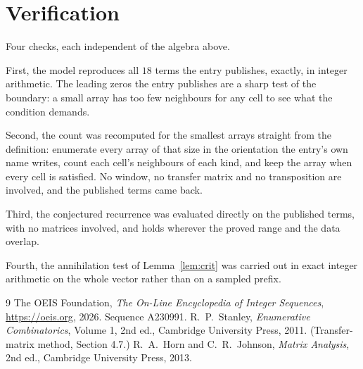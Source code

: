 \documentclass[11pt,a4paper]{article}
\theoremstyle{plain}
\theoremstyle{definition}
\begin{document}
\section{Verification}

Four checks, each independent of the algebra above.

First, the model reproduces all $18$ terms the entry publishes, exactly, in integer
arithmetic. The leading zeros the entry publishes are a sharp test of the boundary: a small
array has too few neighbours for any cell to see what the condition demands.

Second, the count was recomputed for the smallest arrays straight from the definition:
enumerate every array of that size in the orientation the entry's own name writes, count each
cell's neighbours of each kind, and keep the array when every cell is satisfied. No window, no
transfer matrix and no transposition are involved, and the published terms came back.

Third, the conjectured recurrence was evaluated directly on the published terms, with no
matrices involved, and holds wherever the proved range and the data overlap.

Fourth, the annihilation test of Lemma~\ref{lem:crit} was carried out in exact integer
arithmetic on the whole vector rather than on a sampled prefix.

\begin{thebibliography}{9}
 The OEIS Foundation, \emph{The On-Line Encyclopedia of Integer
Sequences}, \url{https://oeis.org}, 2026. Sequence A230991.
 R.~P.~Stanley, \emph{Enumerative Combinatorics}, Volume 1, 2nd ed.,
Cambridge University Press, 2011. (Transfer-matrix method, Section 4.7.)
 R.~A.~Horn and C.~R.~Johnson, \emph{Matrix Analysis}, 2nd ed., Cambridge
University Press, 2013.
\end{thebibliography}
\end{document}
